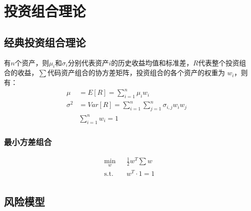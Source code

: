 \chapter{投资组合理论}
\section{经典投资组合理论}
有$n$个资产，则$\mu_i$和$\sigma_i$分别代表资产$i$的历史收益均值和标准差，$R$代表整个投资组合的收益，$\sum$代码资产组合的协方差矩阵，投资组合的各个资产的权重为 $w_i$，则有：
\[\begin{aligned}
\mu &= E[R]=\sum_{i=1}^{n}\mu_iw_i        \\
\sigma^2&= Var[R]=\sum_{i=1}^{n}\sum_{j=1}^{n}\sigma_{i,j}w_iw_j \\
&\sum_{i=1}^{n}w_i= 1
\end{aligned} \]
\subsection{最小方差组合}
\[\begin{aligned}
& \underset{w}{\text{min}}
& & \frac{1}{2} w^T\sum w\\
& \text{s.t.} & &  w^T\cdot 1 = 1 \\
\end{aligned}\]
\section{风险模型}